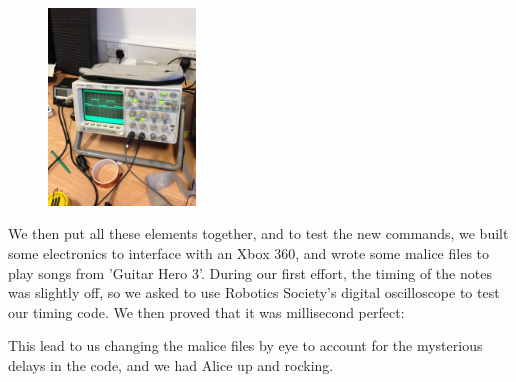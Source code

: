\documentclass[11pt, notitlepage]{report}
\begin{document}
\begin{figure}
  \vspace{-20pt}
  \begin{center}
    \includegraphics[width=0.35\textwidth, angle=270]{IMG_9458.JPG}
    \caption{}
  \end{center}
  \vspace{-10pt}
\end{figure}
We then put all these elements together, and to test the new commands, we built some electronics to interface with an Xbox 360, and wrote some malice files to play songs from 'Guitar Hero 3'. During our first effort, the timing of the notes was slightly off, so we asked to use Robotics Society's digital oscilloscope to test our timing code. We then proved that it was millisecond perfect:

This lead to us changing the malice files by eye to account for the mysterious delays in the code, and we had Alice up and rocking.
\end{document}
